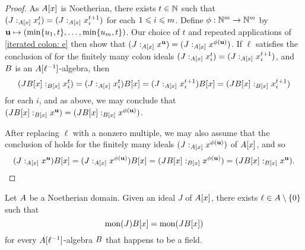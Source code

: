 \documentclass{amsart}
\begin{document}
\begin{proof}
   As $A[x]$ is Noetherian, there exists $t \in \mathbb{N}$ such that $(J:_{A[x]}x_i^t)=(J:_{A[x]}x_i^{t+1})$ for each $1 \leqslant i \leqslant m$.  Define $\phi:  \mathbb{N}^m \to \mathbb{N}^m$ by $\mathbf{u} \mapsto (\min\{u_1, t\}, \ldots, \min \{u_m,t\})$.  Our choice of $t$ and repeated applications of \eqref{iterated colon: e} then show that $(J:_{A[x]}x^{\mathbf{u}}) = (J:_{A[x]}x^{\phi(\mathbf{u})})$.
   If $\ell$ satisfies the conclusion of  for the finitely many colon ideals $(J:_{A[x]}x_i^t)=(J:_{A[x]}x_i^{t+1})$, and $B$ is an $A[\ell^{-1}]$-algebra, then
 \[
       (J B[x]:_{B[x]} x_i^{t}) = (J:_{A[x]}x_i^{t})B[x]
                               = (J:_{A[x]}x_i^{t+1})B[x]
                               =(J B[x]:_{B[x]} x_i^{t+1})
   \]
   for each $i$, and as above, we may conclude that $(J B[x]:_{B[x]}x^{\mathbf{u}}) = (J B[x]:_{B[x]}x^{\phi(\mathbf{u})})$.

   After replacing $\ell$ with a nonzero multiple, we may also assume that the conclusion of  holds for the finitely many ideals $(J:_{A[x]} x^{\phi(\mathbf{u})})$ of $A[x]$, and so
\[ (J:_{A[x]} x^{\mathbf{u}})B[x] = (J:_{A[x]} x^{\phi(\mathbf{u})})B[x] = (J B[x]:_{B[x]} x^{\phi(\mathbf{u})}) = (J B[x]:_{B[x]} x^{\mathbf{u}}). \qedhere\]
\end{proof}

\begin{theorem}
\label{mon-operation-general-expansion: T}
Let $A$ be a Noetherian domain.  Given an ideal $J$ of $A[x]$, there exists $\ell \in A \setminus \{0\}$ such that 
\[ \operatorname{mon}(J) B[x] = \operatorname{mon}(J B[x])\]
for every $A[\ell^{-1}]$-algebra $B$ {that happens to be a field}.
\end{theorem}
\end{document}
